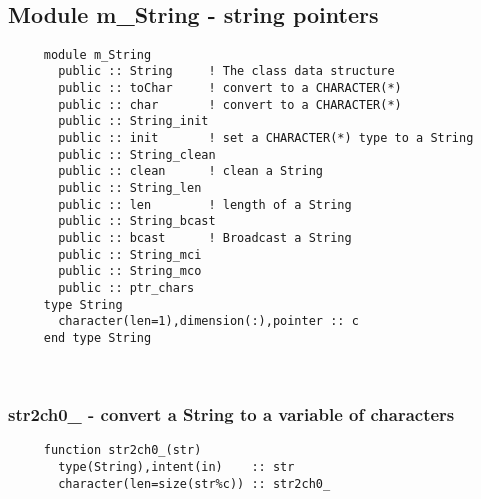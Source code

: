  
 
\mbox{}\hrulefill\ 
 
  \subsection{Module m\_String - string pointers }

\begin{verbatim} 
     module m_String
       public :: String		! The class data structure
       public :: toChar		! convert to a CHARACTER(*)
       public :: char		! convert to a CHARACTER(*)
       public :: String_init
       public :: init		! set a CHARACTER(*) type to a String
       public :: String_clean
       public :: clean		! clean a String
       public :: String_len
       public :: len		! length of a String 
       public :: String_bcast
       public :: bcast		! Broadcast a String 
       public :: String_mci
       public :: String_mco
       public :: ptr_chars
     type String
       character(len=1),dimension(:),pointer :: c
     end type String
 \end{verbatim}%
 
 
\mbox{}\hrulefill\ 
 
  \subsubsection{str2ch0\_ - convert a String to a variable of characters}

\begin{verbatim} 
     function str2ch0_(str)
       type(String),intent(in)    :: str
       character(len=size(str%c)) :: str2ch0_
 \end{verbatim}%
 
 
